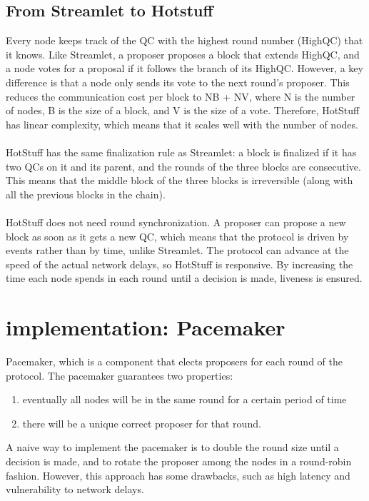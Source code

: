 \subsection{From Streamlet to Hotstuff}
Every node keeps track of the QC with the highest round number (HighQC) that it knows. Like Streamlet, a proposer proposes a block that extends HighQC, and a node votes for a proposal if it follows the branch of its HighQC. However, a key difference is that a node only sends its vote to the next round’s proposer. This reduces the communication cost per block to NB + NV, where N is the number of nodes, B is the size of a block, and V is the size of a vote. Therefore, HotStuff has linear complexity, which means that it scales well with the number of nodes.\\\\
HotStuff has the same finalization rule as Streamlet: a block is finalized if it has two QCs on it and its parent, and the rounds of the three blocks are consecutive. This means that the middle block of the three blocks is irreversible (along with all the previous blocks in the chain).\\\\
HotStuff does not need round synchronization. A proposer can propose a new block as soon as it gets a new QC, which means that the protocol is driven by events rather than by time, unlike Streamlet. The protocol can advance at the speed of the actual network delays, so HotStuff is responsive. By increasing the time each node spends in each round until a decision is made, liveness is ensured.

\section{implementation: Pacemaker}
Pacemaker, which is a component that elects proposers for each round of the protocol.
The pacemaker guarantees two properties:
\begin{enumerate}
	\item eventually all nodes will be in the same round for a certain period of time
	\item there will be a unique correct proposer for that round.
\end{enumerate}
A naive way to implement the pacemaker is to double the round size until a decision is made, and to rotate the proposer among the nodes in a round-robin fashion. However, this approach has some drawbacks, such as high latency and vulnerability to network delays.

